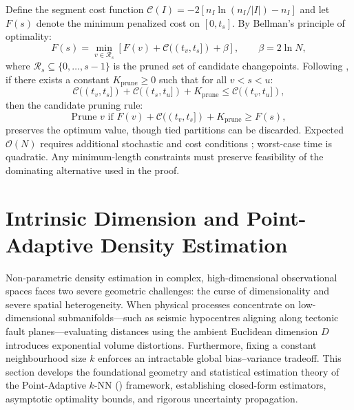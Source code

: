 \begin{definition}
  \label{def:pelt}
  Define the segment cost function $\mathcal{C}(I) = -2[n_I \ln(n_I
  / |I|) - n_I]$ and let $F(s)$ denote the minimum penalized cost on
  $[0, t_s]$. By Bellman's principle of optimality:
  \begin{equation}
    F(s) = \min_{v \in \mathcal{R}_s} \left[ F(v) +
    \mathcal{C}((t_v, t_s]) + \beta \right], \qquad \beta = 2\ln N,
    \label{eq:pelt_bellman}
  \end{equation}
  where $\mathcal{R}_s \subseteq \{0, \dots, s-1\}$ is the pruned
  set of candidate changepoints. Following \citet{killick2012}, if
  there exists a constant $K_{\mathrm{prune}} \ge 0$ such that for
  all $v < s < u$:
  \begin{equation}
    \mathcal{C}((t_v, t_s]) + \mathcal{C}((t_s, t_u]) +
    K_{\mathrm{prune}} \le \mathcal{C}((t_v, t_u]),
    \label{eq:pelt_condition}
  \end{equation}
  then the candidate pruning rule:
  \begin{equation}
    \text{Prune } v \text{ if } F(v) + \mathcal{C}((t_v, t_s]) +
    K_{\mathrm{prune}} \ge F(s),
    \label{eq:pelt_pruning_rule}
  \end{equation}
  preserves the optimum value, though tied partitions can be discarded.
  Expected $\mathcal O(N)$ requires additional stochastic and cost
  conditions \parencite{killick2012}; worst-case time is quadratic.
  Any minimum-length constraints must preserve feasibility of the
  dominating alternative used in the proof.
\end{definition}

\section{Intrinsic Dimension and Point-Adaptive Density Estimation}
\label{sec:pak_theory}

Non-parametric density estimation in complex, high-dimensional
observational spaces faces two severe geometric challenges: the
curse of dimensionality and severe spatial heterogeneity. When
physical processes concentrate on low-dimensional
submanifolds---such as seismic hypocentres aligning along tectonic
fault planes---evaluating distances using the ambient Euclidean
dimension $D$ introduces exponential volume distortions.
Furthermore, fixing a constant neighbourhood size $k$ enforces an
intractable global bias--variance tradeoff. This section develops
the foundational geometry and statistical estimation theory of the
Point-Adaptive $k$-NN (\pak{}) framework, establishing closed-form
estimators, asymptotic optimality bounds, and rigorous uncertainty propagation.

